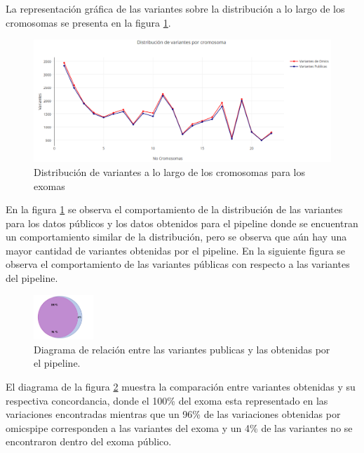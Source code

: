 La representación gráfica de las variantes sobre la distribución a lo largo de los cromosomas se presenta en la figura \ref{fig:variaciones2}. \\

\begin{figure}[H]
	\centering
	\includegraphics[width=1\textwidth]{Kap2/variaciones2}
	\caption{Distribución de variantes a lo largo de los cromosomas para los exomas} \label{fig:variaciones2}
\end{figure}

En la figura \ref{fig:variaciones2} se observa el comportamiento de la distribución de las variantes para los datos públicos y los datos obtenidos para el pipeline donde se encuentran un comportamiento similar de la distribución, pero se observa que aún hay una mayor cantidad de variantes obtenidas por el pipeline. En la siguiente figura se observa el comportamiento de las variantes públicas con respecto a las variantes del pipeline. \\

\begin{figure}[H]
	\centering
	\includegraphics[width=0.2\textwidth]{Kap2/validacion1}
	\caption{Diagrama de relación entre las variantes publicas y las obtenidas por el pipeline.} \label{fig:diagrama2}
\end{figure}

El diagrama de la figura \ref{fig:diagrama2} muestra la comparación entre variantes obtenidas y su respectiva concordancia, donde el 100\% del exoma esta representado en las variaciones encontradas mientras que un 96\% de las variaciones obtenidas por omicspipe corresponden a las variantes del exoma y un 4\% de las variantes no se encontraron dentro del exoma público. \\


